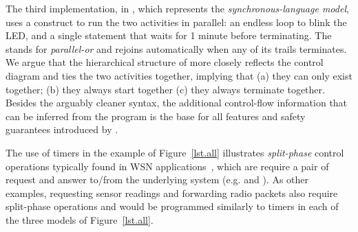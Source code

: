 
The third implementation, in \CEU, which represents the 
\emph{synchronous-language model}, uses a  construct to run the 
two activities in parallel:
an endless loop to blink the LED, and a single statement that waits for 1 
minute before terminating.
The  stands for \emph{parallel-or} and rejoins automatically when 
any of its trails terminates.
%
We argue that the hierarchical structure of \CEU more closely reflects the 
control diagram and ties the two activities together, implying that
(a) they can only exist together;
(b) they always start together
(c) they always terminate together.
%
Besides the arguably cleaner syntax, the additional control-flow information 
that can be inferred from the program is the base for all features and safety 
guarantees introduced by \CEU.


The use of timers in the example of Figure~\ref{lst.all} illustrates 
\emph{split-phase} control operations typically found in WSN 
applications~\cite{wsn.tos}, which are require a pair of request and answer 
to/from the underlying system (e.g.  and ).
%
As other examples, requesting sensor readings and forwarding radio packets also 
require split-phase operations and would be programmed similarly to timers in 
each of the three models of Figure~\ref{lst.all}.
